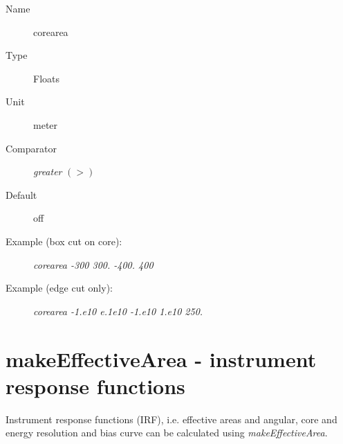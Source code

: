\documentclass[titlepage,a4paper,twoside,11pt]{report}
\begin{document}
\begin{description}
\item[Name] corearea
\item[Type] Floats
\item[Unit] meter
\item[Comparator] {\it greater  } $(>)$
\item[Default] off
\item[Example (box cut on core):] {\it corearea -300 300. -400. 400}
\item[Example (edge cut only):] {\it corearea -1.e10 e.1e10 -1.e10 1.e10 250.}
\end{description}



\chapter{makeEffectiveArea - instrument response functions}

Instrument response functions (IRF), i.e. effective areas and angular, core and energy resolution and bias curve can be calculated using {\it makeEffectiveArea}. 
\end{document}
